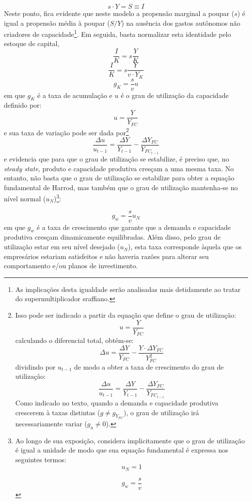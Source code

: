 $$
s\cdot Y = S \equiv I
$$
Neste ponto, fica evidente que neste modelo a propensão marginal a poupar ($s$) é igual a propensão média à poupar ($S/Y$) na ausência dos gastos autônomos não criadores de capacidade\footnote{As implicações desta igualdade serão analisadas mais detidamente ao tratar do supermultiplicador sraffiano.}. Em seguida, basta normalizar esta identidade pelo estoque de capital,
$$
\frac{I}{K} = s\frac{Y}{K}
$$
$$
\frac{I}{K} = s\frac{Y}{v\cdot Y_K}
$$
\begin{equation}
    g_K = \frac{s}{v}u
\end{equation}
em que $g_K$ é a taxa de acumulação e $u$ é o grau de utilização da capacidade definido por:
$$
u = \frac{Y}{Y_{FC}}
$$
e sua taxa de variação pode ser dada por\footnote{Isso pode ser indicado a partir da equação que define o grau de utilização:
	$$
	u = \frac{Y}{Y_{FC}}
	$$
	calculando o diferencial total, obtém-se:
	$$
	\Delta u = \frac{\Delta Y}{ Y_{FC}} - \frac{Y\cdot \Delta Y_{FC}}{Y_{FC}^2}
	$$
	dividindo por $u_{t-1}$ de modo a obter a taxa de crescimento do grau de utilização:
	$$
	\frac{\Delta u}{u_{t-1}} = \frac{\Delta Y}{Y_{t-1}} - \frac{\Delta Y_{FC}}{Y_{FC_{t-1}}}
	$$
	Como indicado no texto, quando a demanda e capacidade produtiva crescerem à taxas distintas ($g \neq g_{Y_{FC}}$), o grau de utilização irá necessariamente variar ($g_u \neq 0$).
}
$$
\frac{\Delta u}{u_{t-1}} = \frac{\Delta Y}{Y_{t-1}} - \frac{\Delta Y_{FC}}{Y_{FC_{t-1}}}
$$
e evidencia que para que o grau de utilização se estabilize, é preciso que, no \textit{steady state}, produto e capacidade produtiva cresçam a uma mesma taxa. 
No entanto, não basta que o grau de utilização se estabilize para obter a equação fundamental de Harrod, mas também que o grau de utilização mantenha-se no nível normal ($u_N$)\footnote{
	Ao longo de sua exposição, \textcite{harrod_essay_1939} considera implicitamente que o grau de utilização é igual a unidade de modo que sua equação fundamental é expressa nos seguintes termos:
	$$
	u_N = 1
	$$
	
	$$
	g_w = \frac{s}{v}
	$$
}:

\begin{equation}
    \label{Fundamental}
    g_w = \frac{s}{v}u_N
\end{equation}
em que $g_w$ é a taxa de crescimento que garante que a demanda e capacidade produtiva cresçam dinamicamente equilibradas. Além disso, pelo grau de utilização estar em seu nível desejado ($u_N$), esta taxa corresponde àquela que os empresários estariam satisfeitos e não haveria razões para alterar seu comportamento e/ou planos de investimento. 

